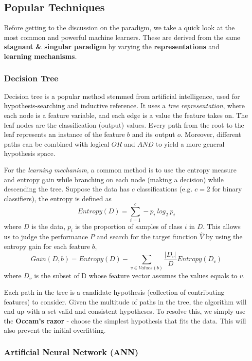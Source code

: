 \documentclass[12pt]{article}  %
\begin{document}
\subsection{Popular Techniques}

Before getting to the discussion on the paradigm, we take a quick look at the most common and powerful machine learners. These are derived from the same {\bf stagnant \& singular paradigm} by varying the {\bf representations} and {\bf learning mechanisms}.



\subsubsection{Decision Tree}

Decision tree is a popular method stemmed from artificial intelligence, used for hypothesis-searching and inductive reference. It uses a {\em tree representation}, where each node is a feature variable, and each edge is a value the feature takes on. The leaf nodes are the classification (output) values. Every path from the root to the leaf represents an instance of the feature $b$ and its output $o$. Moreover, different paths can be combined with logical $OR$ and $AND$ to yield a more general hypothesis space.

For the {\em learning mechanism}, a common method is to use the entropy measure and entropy gain while branching on each node (making a decision) while descending the tree. Suppose the data has $c$ classifications (e.g. $c=2$ for binary classifiers), the entropy is defined as $$Entropy(D) = \sum_{i=1}^{c} -p_i \ log_2 \ p_i$$ where $D$ is the data, $p_i$ is the proportion of samples of class $i$ in $D$. This allows us to judge the performance $P$ and search for the target function $\hat{V}$ by using the entropy gain for each feature $b$, $$Gain(D,b) = Entropy(D) - \sum_{v\in Values(b)} \frac{|D_v|}{D} Entropy(D_v)$$ where $D_v$ is the subset of D whose feature vector assumes the values equals to $v$.

Each path in the tree is a candidate hypothesis (collection of contributing features) to consider. Given the multitude of paths in the tree, the algorithm will end up with a set valid and consistent hypotheses. To resolve this, we simply use the {\bf Occam's razor} - choose the simplest hypothesis that fits the data. This will also prevent the initial overfitting.



\subsubsection{Artificial Neural Network (ANN)}
\end{document}
